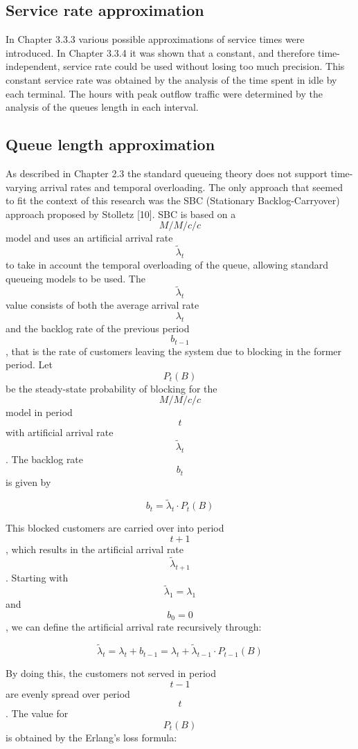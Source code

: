 \subsection{Service rate approximation}
\label{subsec:service_rate_approximation}
In Chapter 3.3.3 various possible approximations of service times were introduced. In Chapter 3.3.4 it was shown that a constant, and therefore time-independent, service rate could be used without losing too much precision. This constant service rate was obtained by the analysis of the time spent in idle by each terminal. The hours with peak outflow traffic were determined by the analysis of the queues length in each interval.

\subsection{Queue length approximation}
\label{subsec:queue_length_approximation}
As described in Chapter 2.3 the standard queueing theory does not support time-varying arrival rates and temporal overloading. The only approach that seemed to fit the context of this research was the SBC (Stationary Backlog-Carryover) approach proposed by Stolletz [10]. SBC is based on a $$ M/M/c/c $$ model and uses an artificial arrival rate $$ \widetilde{\lambda}_t $$ to take in account the temporal overloading of the queue, allowing standard queueing models to be used. The $$ \widetilde{\lambda}_t $$ value consists of both the average arrival rate $$ \lambda_t $$ and the backlog rate of the previous period $$ b_{t-1} $$, that is the rate of customers leaving the system due to blocking in the former period.
Let $$ P_t(B) $$ be the steady-state probability of blocking for the $$ M/M/c/c $$model in period $$ t $$ with artificial arrival rate $$ \widetilde{\lambda}_t $$. The backlog rate $$ b_t $$ is given by

$$ b_t = \widetilde{\lambda}_t \cdot P_t(B) $$

This blocked customers are carried over into period $$ t+1$$, which results in the artificial arrival rate $$ \widetilde{\lambda}_{t+1} $$.
Starting with $$ \widetilde{\lambda}_1 = \lambda_1 $$ and $$ b_0 = 0 $$, we can define the artificial arrival rate recursively through:

$$ \widetilde{\lambda}_t = \lambda_t + b_{t-1} = \lambda_t + \widetilde{\lambda}_{t-1} \cdot P_{t-1}(B) $$

By doing this, the customers not served in period $$ t-1 $$ are evenly spread over period $$ t $$. The value for $$ P_t(B) $$ is obtained by the Erlang’s loss formula:

